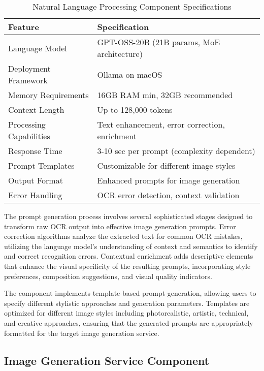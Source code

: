 \begin{table}[H]
\centering
\small
\caption{Natural Language Processing Component Specifications}
\label{tab:nlp_specifications}
\begin{tabular}{ll}
\toprule
\textbf{Feature} & \textbf{Specification} \\
\midrule
Language Model & GPT-OSS-20B (21B params, MoE architecture) \\
Deployment Framework & Ollama on macOS \\
Memory Requirements & 16GB RAM min, 32GB recommended \\
Context Length & Up to 128,000 tokens \\
Processing Capabilities & Text enhancement, error correction, enrichment \\
Response Time & 3-10 sec per prompt (complexity dependent) \\
Prompt Templates & Customizable for different image styles \\
Output Format & Enhanced prompts for image generation \\
Error Handling & OCR error detection, context validation \\
\bottomrule
\end{tabular}
\end{table}

The prompt generation process involves several sophisticated stages designed to transform raw OCR output into effective image generation prompts. Error correction algorithms analyze the extracted text for common OCR mistakes, utilizing the language model's understanding of context and semantics to identify and correct recognition errors. Contextual enrichment adds descriptive elements that enhance the visual specificity of the resulting prompts, incorporating style preferences, composition suggestions, and visual quality indicators.

The component implements template-based prompt generation, allowing users to specify different stylistic approaches and generation parameters. Templates are optimized for different image styles including photorealistic, artistic, technical, and creative approaches, ensuring that the generated prompts are appropriately formatted for the target image generation service.

\subsection{Image Generation Service Component}

